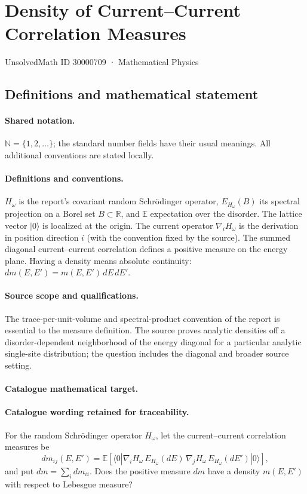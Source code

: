 \documentclass[11pt]{article}
\begin{document}
\setcounter{section}{30000708}
\section{Density of Current–Current Correlation Measures}\label{30000709}
{\small UnsolvedMath ID 30000709 · Mathematical Physics}
\subsection{Definitions and mathematical statement}

\paragraph{Shared notation.}$\mathbb N=\{1,2,\ldots\}$; the standard number fields have their usual meanings. All additional conventions are stated locally.


\paragraph{Definitions and conventions.} $H_\omega$ is the report's covariant random Schrödinger operator, $E_{H_\omega}(B)$ its spectral projection on a Borel set $B\subset\mathbb R$, and $\mathbb E$ expectation over the disorder. The lattice vector $|0\rangle$ is localized at the origin. The current operator $\nabla_iH_\omega$ is the derivation in position direction $i$ (with the convention fixed by the source). The summed diagonal current--current correlation defines a positive measure on the energy plane. Having a density means absolute continuity: $dm(E,E')=m(E,E')\,dE\,dE'$.

\paragraph{Source scope and qualifications.} The trace-per-unit-volume and spectral-product convention of the report is essential to the measure definition. The source proves analytic densities off a disorder-dependent neighborhood of the energy diagonal for a particular analytic single-site distribution; the question includes the diagonal and broader source setting.

\paragraph{Catalogue mathematical target.}
\paragraph{Catalogue wording retained for traceability.}
For the random Schrödinger operator $H_\omega$, let the current–current correlation measures be $$dm_{ij}(E,E')=\mathbb E\!\left[\langle0|\nabla_iH_\omega\,E_{H_\omega}(dE)\,\nabla_jH_\omega\,E_{H_\omega}(dE')|0\rangle\right],$$ and put $dm=\sum_i dm_{ii}$. Does the positive measure $dm$ have a density $m(E,E')$ with respect to Lebesgue measure?
\end{document}
